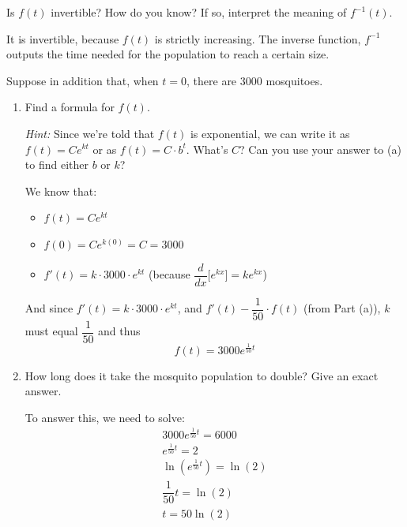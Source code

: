 \documentclass{article}
\begin{document}
\begin{enumerate}
\begin{enumerate}
    \begin{problem}[\vfill]
      Is $f(t)$ invertible? How do you know? If so, interpret the meaning of $f^{-1}(t)$. 
    \end{problem}

    \begin{solution}
        It is invertible, because $f(t)$ is strictly increasing. The inverse function, $f^{-1}$ outputs the time needed for the population to reach a certain size.  
    \end{solution}

  \end{enumerate}
  Suppose in addition that, when $t = 0$, there are 3000 mosquitoes. 
  \begin{enumerate}[resume]
  \item

    \begin{problem}[\stretch{2}]
      Find a formula for $f(t)$.

      \emph{Hint:} Since we're told that $f(t)$ is exponential, we can write it as $f(t) = C e^{kt}$ or as $f(t) = C \cdot b^t$. What's $C$? Can you use your answer to (a) to find either $b$ or $k$? 
    \end{problem}

    \begin{solution}
        We know that:
        \begin{itemize}
            \item $f(t) = Ce^{kt}$
            \item $f(0) = Ce^{k(0)} = C = 3000$
            \item $f'(t) = k \cdot 3000 \cdot e^{kt}$ (because $\dfrac{d}{dx}\Big[e^{kx}\Big]=ke^{kx}$)
        \end{itemize}
        And since $f'(t) = k \cdot 3000 \cdot e^{kt}$, and $f'(t) - \dfrac{1}{50} \cdot f(t)$ (from Part (a)), $k$ must equal $\dfrac{1}{50}$ and thus 
        $$f(t) = 3000 e^{\frac{1}{50}t}$$
    \end{solution}

  \item %

    \begin{problem}[\nstretch{1.5}]
      How long does it take the mosquito population to double? Give an exact answer.
    \end{problem}

    \begin{solution}
        To answer this, we need to solve:
        \begin{align*}
            3000 e^{\frac{1}{50}t} = 6000 \\
            e^{\frac{1}{50}t} = 2 \\
            \ln(e^{\frac{1}{50}t}) = \ln(2)\\
            \dfrac{1}{50} t = \ln(2) \\
            t = 50 \ln(2)\\
        \end{align*}
        

\end{solution}
\end{enumerate}
\end{enumerate}
\end{document}
